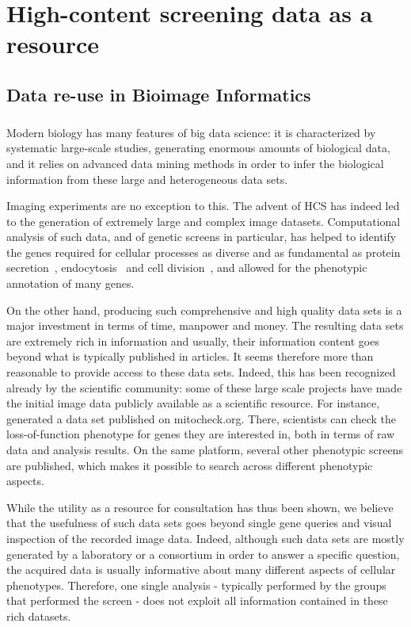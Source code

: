 
\chapter{High-content screening data as a resource}
\label{chap:reuse}
\section{Data re-use in Bioimage Informatics}
\paragraph*{}

Modern biology has many features of big data science: it is
characterized by systematic large-scale studies, generating enormous
amounts of biological data, and it relies on advanced data mining
methods in order to infer the biological information from these large
and heterogeneous data sets. 

Imaging experiments are no exception to this. The advent of HCS has indeed led to the generation of extremely large and complex image datasets. Computational analysis of such data, and of genetic screens in particular, has helped to identify the genes required for cellular processes as diverse and as fundamental as protein secretion~\cite{simpson2012genome}, endocytosis~\cite{collinet2010systems} and cell division~\cite{pmid20360735}, and allowed for the phenotypic annotation of many
genes.  

On the other hand, producing such comprehensive and high quality data
sets is a major investment in terms of time, manpower and money. The
resulting data sets are extremely rich in information and usually,
their information content goes beyond what is typically published in
articles. It seems therefore more than reasonable to provide access to
these data sets. Indeed, this has been recognized already by the
scientific community: some of these large scale
projects have made the initial image data publicly available as a
scientific resource. For instance, ~\cite{pmid20360735} generated a
data set published on mitocheck.org. There, scientists can check the
loss-of-function phenotype for genes they are interested in, both in
terms of raw data and analysis results. On the same
platform, several other phenotypic screens are published, which makes it possible to search across different phenotypic aspects. 


While the utility as a resource for consultation has thus been shown, we
believe that the usefulness of such data sets goes beyond single gene
queries and visual inspection of the recorded image data. Indeed, although such data sets are mostly generated  by a laboratory or a consortium in order to answer a specific question, the acquired
data is usually informative about many different aspects of cellular
phenotypes. Therefore, one single analysis - typically performed by
the groups that performed the screen - does not exploit all information
contained in these rich datasets. 

